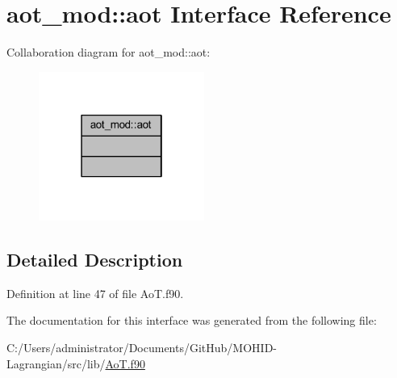 \hypertarget{interfaceaot__mod_1_1aot}{}\section{aot\+\_\+mod\+:\+:aot Interface Reference}
\label{interfaceaot__mod_1_1aot}


Collaboration diagram for aot\+\_\+mod\+:\+:aot\+:\nopagebreak
\begin{figure}[H]
\begin{center}
\leavevmode
\includegraphics[width=154pt]{interfaceaot__mod_1_1aot__coll__graph}
\end{center}
\end{figure}


\subsection{Detailed Description}


Definition at line 47 of file Ao\+T.\+f90.



The documentation for this interface was generated from the following file\+:\begin{DoxyCompactItemize}
\item 
C\+:/\+Users/administrator/\+Documents/\+Git\+Hub/\+M\+O\+H\+I\+D-\/\+Lagrangian/src/lib/\mbox{\hyperlink{_ao_t_8f90}{Ao\+T.\+f90}}\end{DoxyCompactItemize}
